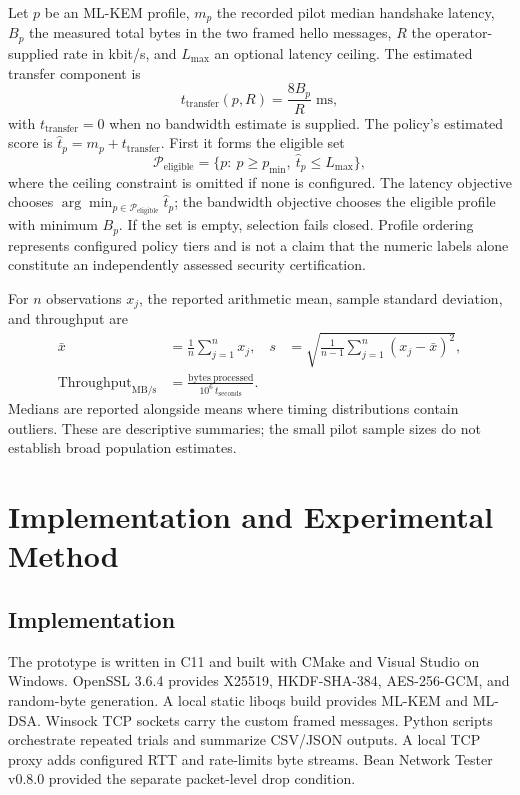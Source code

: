 \documentclass[journal]{IEEEtran}
\begin{document}
Let $p$ be an ML-KEM profile, $m_p$ the recorded pilot median handshake latency, $B_p$ the measured total bytes in the two framed hello messages, $R$ the operator-supplied rate in kbit/s, and $L_{\max}$ an optional latency ceiling. The estimated transfer component is
\begin{equation}
  t_{\mathrm{transfer}}(p,R)=\frac{8B_p}{R}\;\mathrm{ms},
\end{equation}
with $t_{\mathrm{transfer}}=0$ when no bandwidth estimate is supplied. The policy's estimated score is $\hat{t}_p=m_p+t_{\mathrm{transfer}}$. First it forms the eligible set
\begin{equation}
  \mathcal{P}_{\mathrm{eligible}}=\{p:\ p\geq p_{\min},\ \hat{t}_p\leq L_{\max}\},
\end{equation}
where the ceiling constraint is omitted if none is configured. The latency objective chooses $\arg\min_{p\in\mathcal{P}_{\mathrm{eligible}}}\hat{t}_p$; the bandwidth objective chooses the eligible profile with minimum $B_p$. If the set is empty, selection fails closed. Profile ordering represents configured policy tiers and is not a claim that the numeric labels alone constitute an independently assessed security certification.

For $n$ observations $x_j$, the reported arithmetic mean, sample standard deviation, and throughput are
\begin{align}
  \bar{x}&=\frac{1}{n}\sum_{j=1}^{n}x_j, &
  s&=\sqrt{\frac{1}{n-1}\sum_{j=1}^{n}(x_j-\bar{x})^2},\\
  \mathrm{Throughput}_{\mathrm{MB/s}}&=\frac{\mathrm{bytes\ processed}}{10^6\,t_{\mathrm{seconds}}}.
\end{align}
Medians are reported alongside means where timing distributions contain outliers. These are descriptive summaries; the small pilot sample sizes do not establish broad population estimates.

\section{Implementation and Experimental Method}
\subsection{Implementation}
The prototype is written in C11 and built with CMake and Visual Studio on Windows. OpenSSL 3.6.4 provides X25519, HKDF-SHA-384, AES-256-GCM, and random-byte generation. A local static liboqs build provides ML-KEM and ML-DSA. Winsock TCP sockets carry the custom framed messages. Python scripts orchestrate repeated trials and summarize CSV/JSON outputs. A local TCP proxy adds configured RTT and rate-limits byte streams. Bean Network Tester v0.8.0 provided the separate packet-level drop condition.
\end{document}
